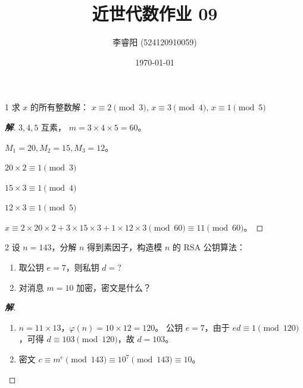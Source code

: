 \documentclass[12pt, a4paper]{article}
\title{近世代数作业 09}
\author{李睿阳 (524120910059)}
\date{\today}
\newenvironment{solution}{
    \begin{proof}[\textbf{解}]
}{
    \end{proof}
}
\begin{document}
\maketitle


\begin{problem}{1}
    求 $x$ 的所有整数解：
    $x \equiv 2 \pmod 3$, $x \equiv 3 \pmod 4$, $x \equiv 1 \pmod 5$
\end{problem}
\begin{solution}
    $3, 4, 5$ 互素，
    $m = 3 \times 4 \times 5 = 60$。

    $M_1 = 20, M_2 = 15, M_3 = 12$。

    $20 \times 2 \equiv 1 \pmod 3$

    $15 \times 3 \equiv 1 \pmod 4$

    $12 \times 3 \equiv 1 \pmod 5$

    $x \equiv 2 \times 20 \times 2 + 3 \times 15 \times 3 + 1 \times 12 \times 3 \pmod{60} \equiv 11 \pmod{60}$。
\end{solution}

\begin{problem}{2}
    设 $n=143$，分解 $n$ 得到素因子，构造模 $n$ 的 RSA 公钥算法：
    \begin{enumerate}[(1)]
        \item 取公钥 $e=7$，则私钥 $d=?$
        \item 对消息 $m=10$ 加密，密文是什么？
    \end{enumerate}
\end{problem}
\begin{solution}
    \begin{enumerate}[(1)]
        \item $n = 11 \times 13$，$\varphi(n) = 10 \times 12 = 120$。
        公钥 $e = 7$，由于 $ed \equiv 1 \pmod{120}$，可得 $d \equiv 103 \pmod{120}$，故 $d=103$。
        \item 密文 $c \equiv m^e \pmod{143} \equiv 10^7 \pmod{143} \equiv 10$。
    \end{enumerate}
\end{solution}
\end{document}
